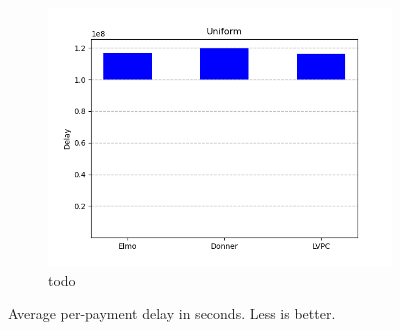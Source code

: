 \begin{figure}
\begin{subfigure}{.3293\textwidth}
  \label{graph:power-law:delays}
  \end{subfigure}
  \begin{subfigure}{.3293\textwidth}
  \includegraphics[width=\textwidth]{../simulation/Delays_uniform.png}
  \caption{todo}
  \label{graph:power-law:delays}
  \end{subfigure}
  \caption{Average per-payment delay in seconds. Less is better.}
  \end{figure}

